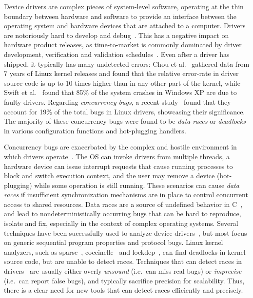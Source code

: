 Device drivers are complex pieces of system-level software, operating at the thin boundary between hardware and software to provide an interface between the operating system and hardware devices that are attached to a computer. Drivers are notoriously hard to develop and debug~\cite{corbet2005linux}. This has a negative impact on hardware product releases, as time-to-market is commonly dominated by driver development, verification and validation schedules~\cite{yavatkar2012era}.
%
Even after a driver has shipped, it typically has many undetected errors: Chou et al.~\cite{chou2001empirical} gathered data from 7 years of Linux kernel releases and found that the relative error-rate in driver source code is up to 10 times higher than in any other part of the kernel, while Swift et al.~\cite{Swift2003windowsxp} found that 85\% of the system crashes in Windows XP are due to faulty drivers. Regarding \emph{concurrency bugs}, a recent study~\cite{ryzhyk2009dingo} found that they account for 19\% of the total bugs in Linux drivers, showcasing their significance. The majority of these concurrency bugs were found to be \emph{data races} or \emph{deadlocks} in various configuration functions and hot-plugging handlers.

Concurrency bugs are exacerbated by the complex and hostile environment in which drivers operate~\cite{corbet2005linux}. The OS can invoke drivers from multiple threads, a hardware device can issue interrupt requests that cause running processes to block and switch execution context, and the user may remove a device (hot-plugging) while some operation is still running.  These scenarios can cause \emph{data races} if insufficient synchronization mechanisms are in place to control concurrent access to shared resources.
%
Data races are a source of undefined behavior in C~\cite[p.\ 38]{iso/iec11}, and lead to nondeterministically occurring bugs that can be hard to reproduce, isolate and fix, especially in the context of complex operating systems.
%
Several techniques have been successfully used to analyze device drivers~\cite{ball2006thorough, clarke2004predicate, engler2000checking, henzinger2002temporal, cook2006termination, kuznetsov2010testing, renzelmann2012symdrive, lal2012corral}, but most focus on generic sequential program properties and protocol bugs. Linux kernel analyzers, such as sparse~\cite{corbet2004sparse}, coccinelle~\cite{padioleau2008doc} and lockdep~\cite{corbet2006lock}, can find deadlocks in kernel source code, but are unable to detect races. Techniques that can detect races in drivers~\cite{dawson2003racerx, qadeer2004kiss, pratikakis2006locksmith, voung2007relay, lal2012corral} are usually either overly \emph{unsound} (i.e.\ can miss real bugs) or \emph{imprecise} (i.e.\ can report false bugs), and typically sacrifice precision for scalability. Thus, there is a clear need for new tools that can detect races efficiently and precisely.


